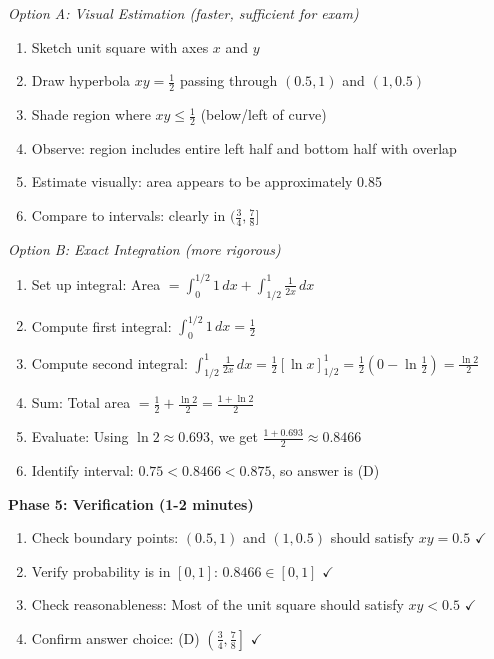 \documentclass[11pt]{article}
\begin{document}
\begin{solutionbox}
\textit{Option A: Visual Estimation (faster, sufficient for exam)}
\begin{enumerate}[resume]
    \item Sketch unit square with axes $x$ and $y$
    \item Draw hyperbola $xy = \frac{1}{2}$ passing through $(0.5, 1)$ and $(1, 0.5)$
    \item Shade region where $xy \leq \frac{1}{2}$ (below/left of curve)
    \item Observe: region includes entire left half and bottom half with overlap
    \item Estimate visually: area appears to be approximately 0.85
    \item Compare to intervals: clearly in $(\frac{3}{4}, \frac{7}{8}]$
\end{enumerate}

\textit{Option B: Exact Integration (more rigorous)}
\begin{enumerate}[resume]
    \item Set up integral: Area $= \int_0^{1/2} 1 \, dx + \int_{1/2}^1 \frac{1}{2x} \, dx$
    \item Compute first integral: $\int_0^{1/2} 1 \, dx = \frac{1}{2}$
    \item Compute second integral: $\int_{1/2}^1 \frac{1}{2x} \, dx = \frac{1}{2}[\ln x]_{1/2}^1 = \frac{1}{2}(0 - \ln\frac{1}{2}) = \frac{\ln 2}{2}$
    \item Sum: Total area $= \frac{1}{2} + \frac{\ln 2}{2} = \frac{1 + \ln 2}{2}$
    \item Evaluate: Using $\ln 2 \approx 0.693$, we get $\frac{1 + 0.693}{2} \approx 0.8466$
    \item Identify interval: $0.75 < 0.8466 < 0.875$, so answer is (D)
\end{enumerate}

\textbf{Phase 5: Verification (1-2 minutes)}
\begin{enumerate}[resume]
    \item Check boundary points: $(0.5, 1)$ and $(1, 0.5)$ should satisfy $xy = 0.5$ $\checkmark$
    \item Verify probability is in $[0,1]$: $0.8466 \in [0,1]$ $\checkmark$
    \item Check reasonableness: Most of the unit square should satisfy $xy < 0.5$ $\checkmark$
    \item Confirm answer choice: (D) $\left(\frac{3}{4}, \frac{7}{8}\right]$ $\checkmark$
\end{enumerate}


\end{solutionbox}
\end{document}
